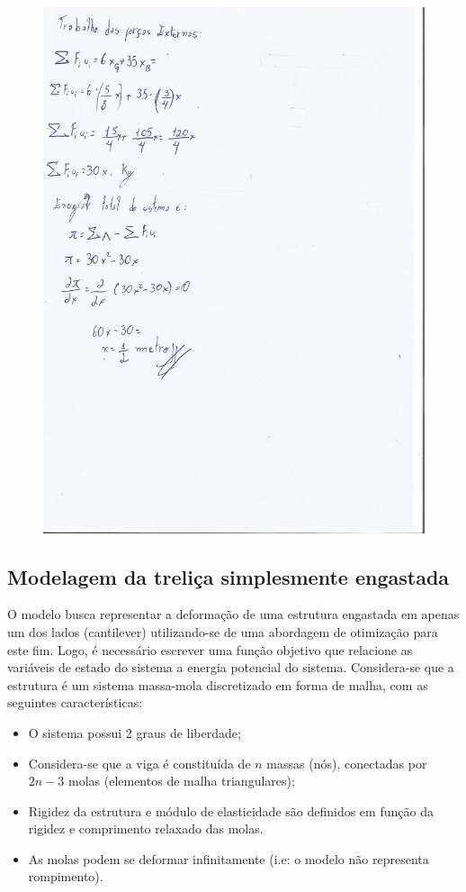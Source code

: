 \documentclass{article}
\begin{document}
\begin{figure}[H]
  \centering
  \includegraphics[width=\linewidth]{ResolucaoCasoAnalitico-1.jpg}
\end{figure}%


\subsection{Modelagem da treliça simplesmente engastada}
O modelo busca representar a deformação de uma estrutura engastada em apenas um dos lados (cantilever) utilizando-se de uma abordagem de otimização para este fim. Logo, é necessário escrever uma função objetivo que relacione as variáveis de estado do sistema a energia potencial do sistema. Considera-se que a estrutura é um sistema massa-mola discretizado em forma de malha, com as seguintes características:

\begin{itemize}
\item O sistema possui 2 graus de liberdade;
\item Considera-se que a viga é constituída de $n$ massas (nós), conectadas por $2n-3$
molas (elementos de malha triangulares);
\item Rigidez da estrutura e módulo de elasticidade são definidos em função da
rigidez e comprimento relaxado das molas.
\item As molas podem se deformar infinitamente (i.e: o modelo não representa
rompimento).
\end{itemize}
\end{document}
